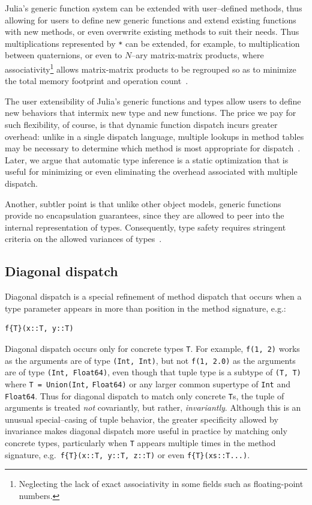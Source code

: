 \documentclass[pldi]{sigplanconf-pldi15}
\begin{document}
Julia's generic function system can be extended with user--defined methods,
thus allowing for users to define new generic functions and extend existing
functions with new methods, or even overwrite existing methods to suit their
needs. Thus multiplications represented by \verb|*| can be extended, for
example, to multiplication between quaternions, or even to $N$--ary
matrix-matrix products, where associativity\footnote{Neglecting the lack of
exact associativity in some fields such as floating-point numbers.} allows
matrix-matrix products to be regrouped so as to minimize the total memory
footprint and operation count~\cite{Hu1984}.

The user extensibility of Julia's generic functions and types allow users to
define new behaviors that intermix new type and new functions. The price we pay
for such flexibility, of course, is that dynamic function dispatch incurs
greater overhead: unlike in a single dispatch language, multiple lookups in
method tables may be necessary to determine which method is most appropriate
for dispatch~\cite{Bruce1995}. Later, we argue that automatic type inference is
a static optimization that is useful for minimizing or even eliminating the
overhead associated with multiple dispatch.

Another, subtler point is that unlike other object models, generic functions
provide no encapsulation guarantees, since they are allowed to peer into the
internal representation of types. Consequently, type safety requires stringent
criteria on the allowed variances of types~\cite{Allen2011}.

\subsection{Diagonal dispatch}

Diagonal dispatch is a special refinement of method dispatch that occurs when a
type parameter appears in more than position in the method signature, e.g.:

\begin{lstlisting}
f{T}(x::T, y::T)
\end{lstlisting}
%
Diagonal dispatch occurs only for concrete types \verb|T|. For example,
\verb|f(1, 2)| works as the arguments are of type \verb|(Int, Int)|, but not
\verb|f(1, 2.0)| as the arguments are of type \verb|(Int, Float64)|, even
though that tuple type is a subtype of \verb|(T, T)| where
\verb|T = Union(Int,| \verb|Float64)| or any larger common supertype of \verb|Int| and
\verb|Float64|. Thus for diagonal dispatch to match only concrete \verb|T|s,
the tuple of arguments is treated \textit{not} covariantly, but rather,
\textit{invariantly}. Although this is an unusual special--casing of tuple
behavior, the greater specificity allowed by invariance makes diagonal dispatch
more useful in practice by matching only concrete types, particularly when
\verb|T| appears multiple times in the method signature, e.g.\ 
\verb|f{T}(x::T, y::T, z::T)| or even \verb|f{T}(xs::T...)|. 
\end{document}
